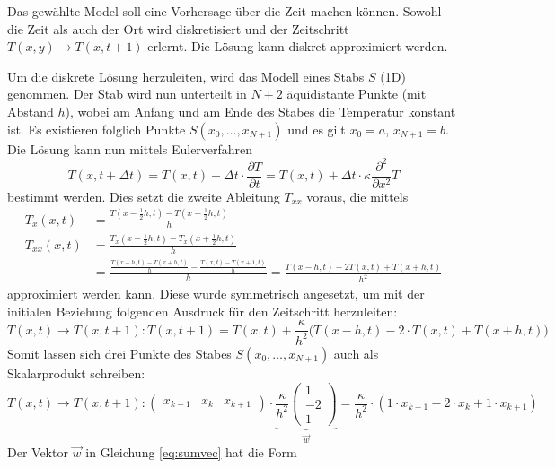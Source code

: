 Das gewählte Model soll eine Vorhersage über die Zeit machen können.
Sowohl die Zeit als auch der Ort wird diskretisiert und der Zeitschritt
$T(x,y) \rightarrow T(x,t+1)$ erlernt. Die Lösung kann diskret
approximiert werden.

Um die diskrete Lösung herzuleiten, wird das Modell eines Stabs $S$
(1D) genommen. Der Stab wird nun unterteilt in $N+2$ äquidistante
Punkte (mit Abstand $h$), wobei am Anfang und am Ende des Stabes
die Temperatur konstant ist. Es existieren folglich Punkte $S(x_0,
\dots, x_{N+1})$ und es gilt $x_0 = a$, $x_{N+1} = b$.
Die Lösung kann nun mittels Eulerverfahren
\begin{equation}
T(x,t+\Delta t) = T(x,t) + \Delta t \cdot  \frac{\partial T}{\partial t} = T(x,t) + \Delta t \cdot \kappa \frac{\partial^2}{\partial x^2} T
\end{equation}
bestimmt werden. Dies setzt die zweite Ableitung $T_{xx}$ voraus,
die mittels
\begin{align}
T_{x}(x, t)  &= \frac{T(x-\frac{1}{2}h, t) - T(x+\frac{1}{2}h, t)}{h}\\
T_{xx}(x, t) &= \frac{T_{x}(x-\frac{1}{2}h, t) - T_{x}(x+\frac{1}{2}h, t)}{h} \\
&= \frac{\frac{T(x-h, t) - T(x+h, t)}{h} - \frac{T(x, t) - T(x+1,t)}{h}}{h} = \frac{T(x-h, t) - 2 T(x, t) + T(x+h, t)}{h^{2}}
\end{align}	
approximiert werden kann.
Diese wurde symmetrisch angesetzt, um mit der initialen Beziehung
folgenden Ausdruck für den Zeitschritt herzuleiten:
\begin{equation}
T(x,t) \rightarrow T(x,t+1) : T(x,t+1) = T(x,t) + \frac{\kappa}{h^{2}} \Big( T(x-h,t) - 2 \cdot T(x,t) + T(x+h,t)  \Big)
\end{equation}
Somit lassen sich drei Punkte des Stabes $S(x_0, \dots, x_{N+1})$ auch als Skalarprodukt schreiben:
\begin{equation}
T(x,t) \rightarrow T(x,t+1) : \begin{pmatrix} x_{k-1} & x_{k} & x_{k+1} \end{pmatrix} \cdot \underbrace{\frac{\kappa}{h^2} \begin{pmatrix} 1 \\ -2 \\ 1 \end{pmatrix}}_{\displaystyle\vec{w}} =  \frac{\kappa}{h^2} \cdot \left( 1 \cdot x_{k-1} - 2 \cdot x_{k} + 1 \cdot x_{k+1} \right)
\label{eq:sumvec}
\end{equation}
Der Vektor $\vec{w}$ in Gleichung \eqref{eq:sumvec} hat die Form
